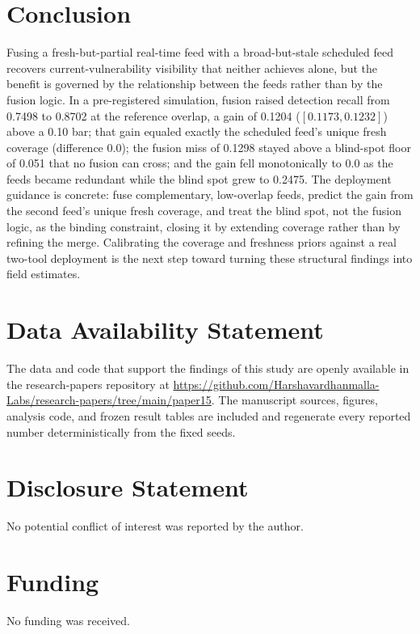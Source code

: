 \documentclass[journal]{IEEEtran}
\begin{document}
\section{Conclusion}
Fusing a fresh-but-partial real-time feed with a broad-but-stale scheduled feed recovers
current-vulnerability visibility that neither achieves alone, but the benefit is governed by the
relationship between the feeds rather than by the fusion logic. In a pre-registered simulation,
fusion raised detection recall from 0.7498 to 0.8702 at the reference overlap, a gain of 0.1204
($[0.1173, 0.1232]$) above a 0.10 bar; that gain equaled exactly the scheduled feed's unique fresh
coverage (difference 0.0); the fusion miss of 0.1298 stayed above a blind-spot floor of 0.051 that
no fusion can cross; and the gain fell monotonically to 0.0 as the feeds became redundant while the
blind spot grew to 0.2475. The deployment guidance is concrete: fuse complementary, low-overlap
feeds, predict the gain from the second feed's unique fresh coverage, and treat the blind spot, not
the fusion logic, as the binding constraint, closing it by extending coverage rather than by
refining the merge. Calibrating the coverage and freshness priors against a real two-tool
deployment is the next step toward turning these structural findings into field estimates.

\section*{Data Availability Statement}
The data and code that support the findings of this study are openly available in the research-papers repository at \url{https://github.com/Harshavardhanmalla-Labs/research-papers/tree/main/paper15}. The manuscript sources, figures, analysis code, and frozen result tables are included and regenerate every reported number deterministically from the fixed seeds.

\section*{Disclosure Statement}
No potential conflict of interest was reported by the author.

\section*{Funding}
No funding was received.
\end{document}
